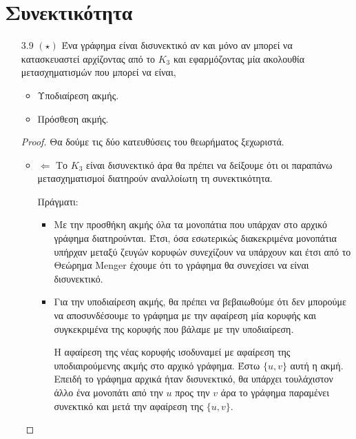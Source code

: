 \documentclass[a4paper, oneside, 11pt]{article}
\begin{document}
\section{Συνεκτικότητα}
\begin{enumerate}
   \item[3.9 $(\star)$]
      Ένα γράφημα είναι δισυνεκτικό αν και μόνο αν μπορεί να κατασκευαστεί
      αρχίζοντας από το $K_3$ και εφαρμόζοντας μία ακολουθία μετασχηματισμών
      που μπορεί να είναι,

      \begin{itemize}
         \item Υποδιαίρεση ακμής.
         \item Πρόσθεση ακμής.
      \end{itemize}

      \begin{proof}
         Θα δούμε τις δύο κατευθύσεις του θεωρήματος ξεχωριστά.
         \begin{itemize}
            \item $\Leftarrow$
               Το $K_3$ είναι δισυνεκτικό άρα θα πρέπει να δείξουμε ότι
               οι παραπάνω μετασχηματισμοί διατηρούν αναλλοίωτη τη
               συνεκτικότητα.

               Πράγματι:

               \begin{itemize}
               \item
               Με την προσθήκη ακμής όλα τα μονοπάτια που υπάρχαν στο
               αρχικό γράφημα διατηρούνται. Έτσι, όσα εσωτερικώς διακεκριμένα
               μονοπάτια υπήρχαν μεταξύ ζευγών κορυφών συνεχίζουν να
               υπάρχουν και έτσι από το Θεώρημα Menger έχουμε ότι το
               γράφημα θα συνεχίσει να είναι δισυνεκτικό.

               \item
               Για την υποδιαίρεση ακμής, θα πρέπει να βεβαιωθούμε ότι
               δεν μπορούμε να αποσυνδέσουμε το γράφημα με την αφαίρεση
               μία κορυφής και συγκεκριμένα της κορυφής που βάλαμε με
               την υποδιαίρεση.

               Η αφαίρεση της νέας κορυφής ισοδυναμεί με αφαίρεση της
               υποδιαιρούμενης ακμής στο αρχικό γράφημα. Έστω $\{u, v\}$
               αυτή η ακμή. Επειδή το γράφημα
               αρχικά ήταν δισυνεκτικό, θα υπάρχει τουλάχιστον άλλο ένα
               μονοπάτι από την $u$ προς την $v$ άρα το γράφημα παραμένει
               συνεκτικό και μετά την αφαίρεση της $\{u, v\}$.
               \end{itemize}


\end{itemize}
\end{proof}
\end{enumerate}
\end{document}
